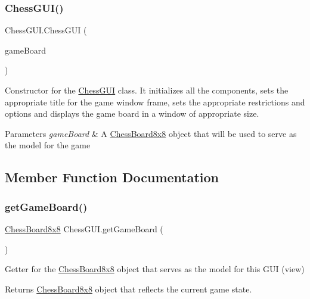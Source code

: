 \subsubsection{\texorpdfstring{Chess\+G\+U\+I()}{ChessGUI()}}
{\footnotesize\ttfamily Chess\+G\+U\+I.\+Chess\+G\+UI (\begin{DoxyParamCaption}\item[{\mbox{\hyperlink{class_chess_board8x8}{Chess\+Board8x8}}}]{game\+Board }\end{DoxyParamCaption})}

Constructor for the \mbox{\hyperlink{class_chess_g_u_i}{Chess\+G\+UI}} class. It initializes all the components, sets the appropriate title for the game window frame, sets the appropriate restrictions and options and displays the game board in a window of appropriate size. 
\begin{DoxyParams}{Parameters}
{\em game\+Board} & A \mbox{\hyperlink{class_chess_board8x8}{Chess\+Board8x8}} object that will be used to serve as the model for the game \\
\hline
\end{DoxyParams}


\subsection{Member Function Documentation}
\mbox{\label{class_chess_g_u_i_ae04ce28bde04da3c93167de58db063fa}} 
\subsubsection{\texorpdfstring{get\+Game\+Board()}{getGameBoard()}}
{\footnotesize\ttfamily \mbox{\hyperlink{class_chess_board8x8}{Chess\+Board8x8}} Chess\+G\+U\+I.\+get\+Game\+Board (\begin{DoxyParamCaption}{ }\end{DoxyParamCaption})}

Getter for the \mbox{\hyperlink{class_chess_board8x8}{Chess\+Board8x8}} object that serves as the model for this G\+UI (view) \begin{DoxyReturn}{Returns}
\mbox{\hyperlink{class_chess_board8x8}{Chess\+Board8x8}} object that reflects the current game state. 
\end{DoxyReturn}
\mbox{\label{class_chess_g_u_i_a45a6b641c9d22eef15ad1b64673e65d9}} 
